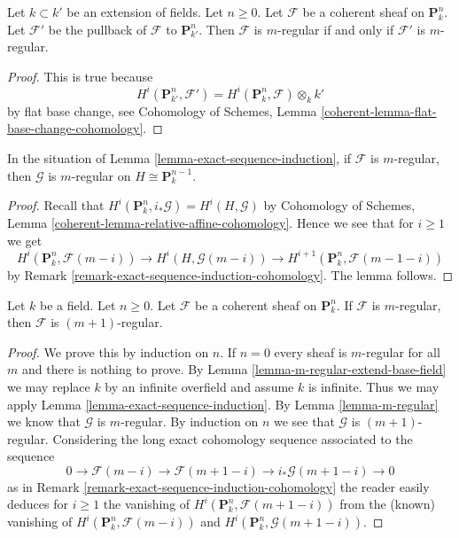 \begin{lemma}
\label{lemma-m-regular-extend-base-field}
Let $k \subset k'$ be an extension of fields. Let $n \geq 0$.
Let $\mathcal{F}$ be a coherent sheaf on $\mathbf{P}^n_k$.
Let $\mathcal{F}'$ be the pullback of $\mathcal{F}$ to $\mathbf{P}^n_{k'}$.
Then $\mathcal{F}$ is $m$-regular if and only if $\mathcal{F}'$ is
$m$-regular.
\end{lemma}

\begin{proof}
This is true because
$$
H^i(\mathbf{P}^n_{k'}, \mathcal{F}') =
H^i(\mathbf{P}^n_k, \mathcal{F}) \otimes_k k'
$$
by flat base change, see
Cohomology of Schemes, Lemma \ref{coherent-lemma-flat-base-change-cohomology}.
\end{proof}

\begin{lemma}
\label{lemma-m-regular}
In the situation of Lemma \ref{lemma-exact-sequence-induction},
if $\mathcal{F}$ is $m$-regular, then $\mathcal{G}$ is $m$-regular
on $H \cong \mathbf{P}^{n - 1}_k$.
\end{lemma}

\begin{proof}
Recall that $H^i(\mathbf{P}^n_k, i_*\mathcal{G}) = H^i(H, \mathcal{G})$ by
Cohomology of Schemes, Lemma \ref{coherent-lemma-relative-affine-cohomology}.
Hence we see that for $i \geq 1$ we get
$$
H^i(\mathbf{P}^n_k, \mathcal{F}(m - i)) \to
H^i(H, \mathcal{G}(m - i)) \to
H^{i + 1}(\mathbf{P}^n_k, \mathcal{F}(m - 1 - i))
$$
by Remark \ref{remark-exact-sequence-induction-cohomology}.
The lemma follows.
\end{proof}

\begin{lemma}
\label{lemma-m-regular-up}
Let $k$ be a field. Let $n \geq 0$.
Let $\mathcal{F}$ be a coherent sheaf on $\mathbf{P}^n_k$.
If $\mathcal{F}$ is $m$-regular, then $\mathcal{F}$ is
$(m + 1)$-regular.
\end{lemma}

\begin{proof}
We prove this by induction on $n$. If $n = 0$ every sheaf is $m$-regular
for all $m$ and there is nothing to prove. By
Lemma \ref{lemma-m-regular-extend-base-field} we may replace $k$
by an infinite overfield and assume $k$ is infinite.
Thus we may apply Lemma \ref{lemma-exact-sequence-induction}.
By Lemma \ref{lemma-m-regular} we know that $\mathcal{G}$ is
$m$-regular. By induction on $n$ we see that $\mathcal{G}$ is
$(m + 1)$-regular. Considering the long exact cohomology sequence
associated to the sequence
$$
0 \to \mathcal{F}(m - i) \to \mathcal{F}(m + 1 - i)
\to i_*\mathcal{G}(m + 1 - i) \to 0
$$
as in Remark \ref{remark-exact-sequence-induction-cohomology}
the reader easily deduces for $i \geq 1$ the vanishing of
$H^i(\mathbf{P}^n_k, \mathcal{F}(m + 1 - i))$ from the (known) vanishing of
$H^i(\mathbf{P}^n_k, \mathcal{F}(m - i))$ and
$H^i(\mathbf{P}^n_k, \mathcal{G}(m + 1 - i))$.
\end{proof}

